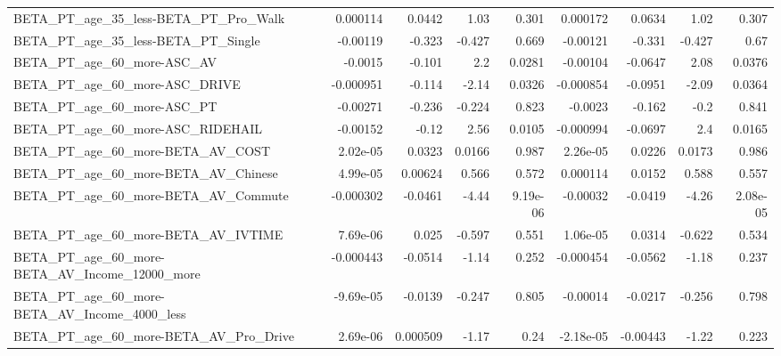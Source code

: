 \begin{tabular}{lrrrrrrrr}
BETA\_PT\_age\_35\_less-BETA\_PT\_Pro\_Walk               &    0.000114 &       0.0442 &      1.03 &    0.301 &   0.000172 &      0.0634 &         1.02 &         0.307 \\
BETA\_PT\_age\_35\_less-BETA\_PT\_Single                 &    -0.00119 &       -0.323 &    -0.427 &    0.669 &   -0.00121 &      -0.331 &       -0.427 &          0.67 \\
BETA\_PT\_age\_60\_more-ASC\_AV                         &     -0.0015 &       -0.101 &       2.2 &   0.0281 &   -0.00104 &     -0.0647 &         2.08 &        0.0376 \\
BETA\_PT\_age\_60\_more-ASC\_DRIVE                      &   -0.000951 &       -0.114 &     -2.14 &   0.0326 &  -0.000854 &     -0.0951 &        -2.09 &        0.0364 \\
BETA\_PT\_age\_60\_more-ASC\_PT                         &    -0.00271 &       -0.236 &    -0.224 &    0.823 &    -0.0023 &      -0.162 &         -0.2 &         0.841 \\
BETA\_PT\_age\_60\_more-ASC\_RIDEHAIL                   &    -0.00152 &        -0.12 &      2.56 &   0.0105 &  -0.000994 &     -0.0697 &          2.4 &        0.0165 \\
BETA\_PT\_age\_60\_more-BETA\_AV\_COST                   &    2.02e-05 &       0.0323 &    0.0166 &    0.987 &   2.26e-05 &      0.0226 &       0.0173 &         0.986 \\
BETA\_PT\_age\_60\_more-BETA\_AV\_Chinese                &    4.99e-05 &      0.00624 &     0.566 &    0.572 &   0.000114 &      0.0152 &        0.588 &         0.557 \\
BETA\_PT\_age\_60\_more-BETA\_AV\_Commute                &   -0.000302 &      -0.0461 &     -4.44 & 9.19e-06 &   -0.00032 &     -0.0419 &        -4.26 &      2.08e-05 \\
BETA\_PT\_age\_60\_more-BETA\_AV\_IVTIME                 &    7.69e-06 &        0.025 &    -0.597 &    0.551 &   1.06e-05 &      0.0314 &       -0.622 &         0.534 \\
BETA\_PT\_age\_60\_more-BETA\_AV\_Income\_12000\_more      &   -0.000443 &      -0.0514 &     -1.14 &    0.252 &  -0.000454 &     -0.0562 &        -1.18 &         0.237 \\
BETA\_PT\_age\_60\_more-BETA\_AV\_Income\_4000\_less       &   -9.69e-05 &      -0.0139 &    -0.247 &    0.805 &   -0.00014 &     -0.0217 &       -0.256 &         0.798 \\
BETA\_PT\_age\_60\_more-BETA\_AV\_Pro\_Drive              &    2.69e-06 &     0.000509 &     -1.17 &     0.24 &  -2.18e-05 &    -0.00443 &        -1.22 &         0.223 \\

\end{tabular}
